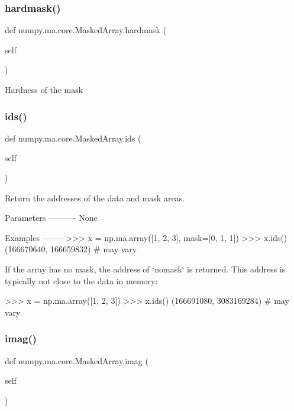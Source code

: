 \subsubsection{\texorpdfstring{hardmask()}{hardmask()}}
{\footnotesize\ttfamily def numpy.\+ma.\+core.\+Masked\+Array.\+hardmask (\begin{DoxyParamCaption}\item[{}]{self }\end{DoxyParamCaption})}

\begin{DoxyVerb}Hardness of the mask \end{DoxyVerb}
 \mbox{\label{classnumpy_1_1ma_1_1core_1_1MaskedArray_abc84affce037f8d0a8c6edf981cd295f}} 
\subsubsection{\texorpdfstring{ids()}{ids()}}
{\footnotesize\ttfamily def numpy.\+ma.\+core.\+Masked\+Array.\+ids (\begin{DoxyParamCaption}\item[{}]{self }\end{DoxyParamCaption})}

\begin{DoxyVerb}Return the addresses of the data and mask areas.

Parameters
----------
None

Examples
--------
>>> x = np.ma.array([1, 2, 3], mask=[0, 1, 1])
>>> x.ids()
(166670640, 166659832) # may vary

If the array has no mask, the address of `nomask` is returned. This address
is typically not close to the data in memory:

>>> x = np.ma.array([1, 2, 3])
>>> x.ids()
(166691080, 3083169284) # may vary\end{DoxyVerb}
 \mbox{\label{classnumpy_1_1ma_1_1core_1_1MaskedArray_a35f630552a387e879468d97fcf4e93de}} 
\subsubsection{\texorpdfstring{imag()}{imag()}}
{\footnotesize\ttfamily def numpy.\+ma.\+core.\+Masked\+Array.\+imag (\begin{DoxyParamCaption}\item[{}]{self }\end{DoxyParamCaption})}

